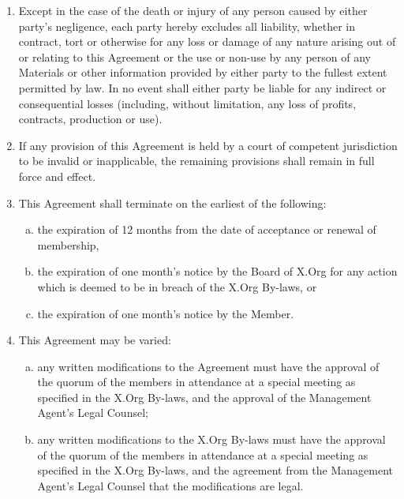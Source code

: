 \documentclass[10pt, english]{xorgdocs}
\begin{document}
\begin{enumerate}[(1)\hspace{.2cm}]
	\item Except in the case of the death or injury of any person caused
	by either party's negligence, each party hereby excludes all liability,
	whether in contract, tort or otherwise for any loss or damage of any
	nature arising out of or relating to this Agreement or the use or
	non-use by any person of any Materials or other information provided
	by either party to the fullest extent permitted by law. In no event
	shall either party be liable for any indirect or consequential losses
	(including, without limitation, any loss of profits, contracts,
	production or use).

	\item If any provision of this Agreement is held by a court of
	competent jurisdiction to be invalid or inapplicable, the remaining
	provisions shall remain in full force and effect.

	\item This Agreement shall terminate on the earliest of the following:

	\begin{enumerate}[(a)\hspace{.2cm}]
		\item the expiration of 12 months from the date of acceptance
		or renewal of membership,
		\item the expiration of one month’s notice by the Board of
		X.Org for any action which is deemed to be in breach of the
		X.Org By-laws, or
		\item the expiration of one month's notice by the Member.
	\end{enumerate}

	\item This Agreement may be varied:

	\begin{enumerate}[(a)\hspace{.2cm}]
		\item any written modifications to the Agreement must have
		the approval of the quorum of the members in attendance at
		a special meeting as specified in the X.Org By-laws, and
		the approval of the Management Agent’s Legal Counsel;
		\item any written modifications to the X.Org By-laws must
		have the approval of the quorum of the members in attendance
		at a special meeting as specified in the X.Org By-laws, and
		the agreement from the Management Agent’s Legal Counsel that
		the modifications are legal.
	\end{enumerate}

\end{enumerate}
\end{document}
